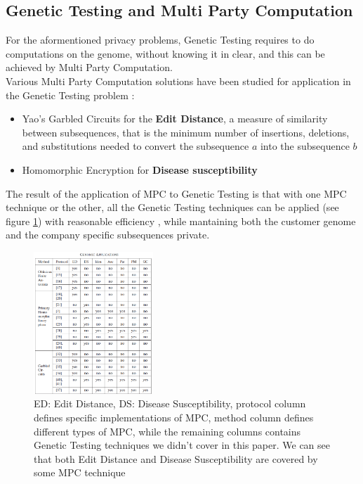 \documentclass[12pt]{article}
\begin{document}
\subsection{Genetic Testing and Multi Party Computation}
For the aformentioned privacy problems, Genetic Testing requires to do computations on the genome, without knowing it in clear, and this can be achieved by Multi Party Computation.\\
Various Multi Party Computation solutions have been studied for application in the Genetic Testing problem \cite{genetic_testing}:
\begin{itemize}
    \item Yao's Garbled Circuits for the \textbf{Edit Distance}, a measure of similarity between subsequences, that is the minimum number of insertions, deletions, and substitutions needed to convert the subsequence $a$ into the subsequence $b$
    \item Homomorphic Encryption for \textbf{Disease susceptibility}
\end{itemize}
The result of the application of MPC to Genetic Testing is that with one MPC technique or the other, all the Genetic Testing techniques can be applied (see figure \ref{fig:table}) with reasonable efficiency \cite{genetic_testing}, while mantaining both the customer genome and the company specific subsequences private.\\
\begin{figure}[H]
    \centering
    \includegraphics[width=0.4\textwidth]{table}
    \caption{ED: Edit Distance, DS: Disease Susceptibility, protocol column defines specific implementations of MPC, method column defines different types of MPC, while the remaining columns contains Genetic Testing techniques we didn't cover in this paper. We can see that both Edit Distance and Disease Susceptibility are covered by some MPC technique \cite{genetic_testing}}
    \label{fig:table}
\end{figure}
\newpage
\end{document}
